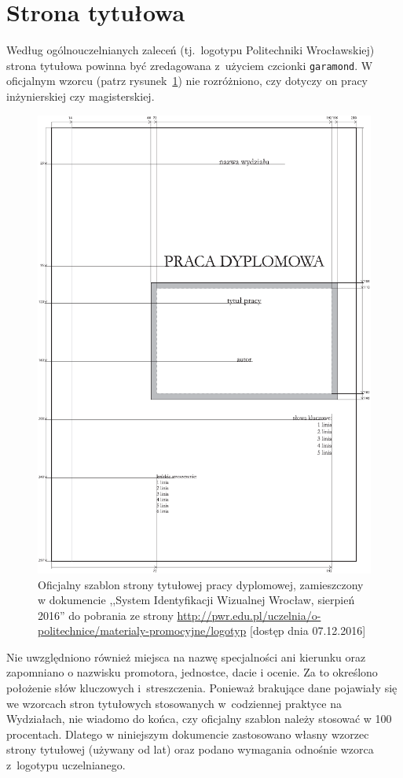 \section{Strona tytułowa}
Według ogólnouczelnianych zaleceń (tj.\ logotypu Politechniki Wrocławskiej) strona tytułowa powinna być zredagowana z~użyciem czcionki \texttt{garamond}. W oficjalnym wzorcu (patrz rysunek~\ref{fig:stronaTytulowa})
nie rozróżniono, czy dotyczy on pracy inżynierskiej czy magisterskiej. 
\begin{figure}[b]
	\centering
	\includegraphics[width=.6\linewidth]{rys03/stronaTytulowa01}
	\caption{Oficjalny szablon strony tytułowej pracy dyplomowej, zamieszczony w dokumencie ,,System 
Identyfikacji Wizualnej Wrocław, sierpień 2016'' do pobrania ze strony \url{http://pwr.edu.pl/uczelnia/o-politechnice/materialy-promocyjne/logotyp} [dostęp dnia 07.12.2016]}
	\label{fig:stronaTytulowa}
\end{figure}
Nie uwzględniono również miejsca na nazwę specjalności ani kierunku oraz zapomniano o nazwisku promotora, jednostce, dacie i ocenie.  Za to określono  położenie słów kluczowych i~streszczenia. Ponieważ brakujące dane pojawiały się we wzorcach stron tytułowych stosowanych w~codziennej praktyce na Wydziałach, nie wiadomo do końca, czy oficjalny szablon należy stosować w 100 procentach. Dlatego w niniejszym dokumencie zastosowano własny wzorzec strony tytułowej (używany od lat) oraz podano wymagania odnośnie wzorca z~logotypu uczelnianego.


